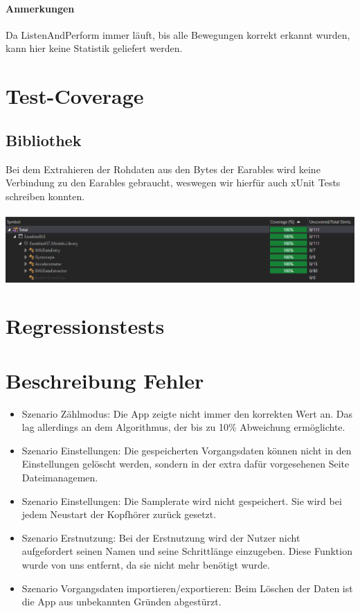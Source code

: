 \documentclass[a4paper,12pt]{article}
\begin{document}
\paragraph{Anmerkungen}
Da ListenAndPerform immer läuft, bis alle Bewegungen korrekt erkannt wurden, kann hier keine Statistik geliefert werden.


\section{Test-Coverage}

\subsection{Bibliothek}
Bei dem Extrahieren der Rohdaten aus den Bytes der Earables wird keine Verbindung zu den Earables gebraucht, weswegen wir hierfür auch xUnit Tests schreiben konnten.
\\ \\ 
\includegraphics[width=1\textwidth]{./bilder/BibTestCoverage/Testcoverage.PNG}


\section{Regressionstests}

\section{Beschreibung Fehler}
\begin{itemize}
	\item[] \textsf{Szenario \glqq Zählmodus\grqq:} Die App zeigte nicht immer den korrekten Wert an.
										Das lag allerdings an dem Algorithmus, der bis zu 10\% Abweichung ermöglichte.
	\item[] \textsf{Szenario \glqq Einstellungen\grqq:} Die gespeicherten Vorgangsdaten können nicht in den Einstellungen gelöscht werden, sondern in der extra dafür vorgesehenen Seite \glqq Dateimanagemen\grqq.
	\item[] \textsf{Szenario \glqq Einstellungen\grqq:} Die Samplerate wird nicht gespeichert. Sie wird bei jedem Neustart der Kopfhörer zurück gesetzt.
	\item[] \textsf{Szenario \glqq Erstnutzung\grqq:} Bei der Erstnutzung wird der Nutzer nicht aufgefordert seinen Namen und seine Schrittlänge einzugeben.
	Diese Funktion wurde von uns entfernt, da sie nicht mehr benötigt wurde.
	\item[] \textsf{Szenario \glqq Vorgangsdaten importieren/exportieren\grqq:} Beim Löschen der Daten ist die App aus unbekannten Gründen abgestürzt.
\end{itemize}
\end{document}
